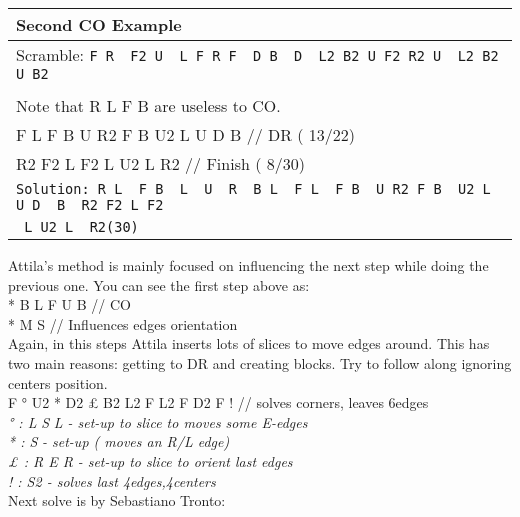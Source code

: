 \documentclass[11pt,a4paper]{book}
\newcommand{\p}{\textquotesingle}
\newcommand{\m}{\texttt}
\newcommand{\ps}{\p\,\,}
\newcommand{\comment}[1]{{\color{gray}\quad//#1}}
\begin{document}
\begin{tabular}{|l|}
\hline
\textbf{Second CO Example }\\
\hline
Scramble: \m{F R\ps F2 U\ps L F R F\ps D B\ps D\ps L2 B2 U F2 R2 U\ps L2 B2 U B2}\\
\hline
\begin{minipage}[l]{0.650\textwidth}
\bigskip
\m{R L\ps F B\ps L\ps U\ps R\ps B L\ps\comment{ Orient R/ L corners (9/9) } \\
Note that R L\ps F B\ps are useless to CO.\\
F L\ps F B\ps U R2 F B\ps U2 L U D\ps B\ps \comment{ DR ( 13/22) }\\
R2 F2 L F2 L U2 L\ps R2 \comment{ Finish ( 8/30) }
}
\bigskip
\bigskip
\bigskip
\bigskip
\end{minipage}
\begin{minipage}[c]{0.25\textwidth}
\centering
\def\svgwidth{\columnwidth}

\end{minipage}\\
\hline
\m{Solution: R L\ps F B\ps L\ps U\ps R\ps B L\ps F L\ps F B\ps U R2 F B\ps U2 L U D\ps B\ps R2 F2 L F2}\\
\m{ L U2 L\ps R2(30)}\\
\hline
\end{tabular}
\bigskip
\newline
Attila’s method is mainly focused on influencing the next step while doing the previous one. You can see the first step above as:\\
\newline
* B\ps L\ps F\ps U B\ps \comment{ CO }\\
* M\ps S\ps \comment{ Influences edges orientation}\\
\newline
Again, in this steps Attila inserts lots of slices to move edges around. This has two main reasons: getting to DR and creating blocks. Try to follow along ignoring centers position.\\
\newline
F ° U2 *  D2 £ B2  L2  F L2 F D2 F ! \comment{ solves corners, leaves 6edges} \\
\textit{° : L\ps S\ps L - set-up to slice to moves some E-edges}\\
\textit{* : S\ps  - set-up ( moves an R/L edge)}\\
\textit{£ : R E  R\ps - set-up to slice to orient last edges}\\
\textit{ ! : S2 - solves last 4edges,4centers}\\
\bigskip
\newline
Next solve is by Sebastiano Tronto:
\end{document}
